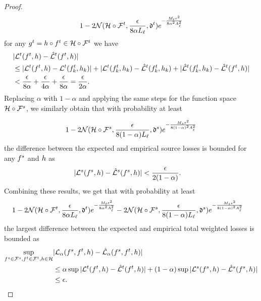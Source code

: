 \documentclass[review,supplement,onefignum,onetabnum]{siamonline250211}
\begin{document}
\begin{proof}
\[1 - 2 \mathcal{N}( \mathcal{H} \circ \mathcal{F}^t, \frac{\epsilon}{8 \alpha L_\ell}, \mathfrak{d}^t) e^{-\frac{M_t \epsilon^2}{8 \alpha^2 A_\ell^2}}
\]
%
for any $g^t = h \circ f^t \in \mathcal{H} \circ \mathcal{F}^t$ we have
%
\begin{equation*}
\begin{split}
& |  \mathcal{L}^t(  f^t, h ) - \hat{\mathcal{L}}^t(  f^t, h )   |  \\
&\leq   |  \mathcal{L}^t(  f^t, h ) - \mathcal{L}^t(  f^t_k, h_k ) | 
 + |   \mathcal{L}^t(  f^t_k, h_k ) -    \hat{\mathcal{L}}^t( f^t_k, h_k) 
  + |   \hat{\mathcal{L}}^t( f^t_k, h_k) -  \hat{\mathcal{L}}^t(  f^t, h )   |  \\
& <   \frac{\epsilon}{8 \alpha } + \frac{\epsilon}{4 \alpha} + \frac{\epsilon}{8 \alpha }
=  \frac{\epsilon}{2 \alpha }.
\end{split}
\end{equation*}
%
Replacing $\alpha$ with $1-\alpha$ and applying the same steps for the function space $\mathcal{H} \circ \mathcal{F}^s$, we similarly obtain that with probability at least 

\[
1 - 2 \mathcal{N}( \mathcal{H} \circ \mathcal{F}^s, \frac{\epsilon}{8 (1-\alpha) L_\ell}, \mathfrak{d}^s) e^{-\frac{M_s \epsilon^2}{8 (1-\alpha)^2 A_\ell^2}}
\]
%
the difference between the expected and empirical source losses is bounded for any $f^s$ and $h$ as
%
\begin{equation*}
\begin{split}
& |  \mathcal{L}^s(  f^s, h ) - \hat{\mathcal{L}}^s(  f^s, h )   |  <  
  \frac{\epsilon}{2 (1-\alpha) }.
\end{split}
\end{equation*}
%
Combining these results, we get that with probability at least 
%
\begin{equation}
\begin{split}
&1 - 2 \mathcal{N}( \mathcal{H} \circ \mathcal{F}^t, \frac{\epsilon}{8 \alpha L_\ell}, \mathfrak{d}^t) e^{-\frac{M_t \epsilon^2}{8 \alpha^2 A_\ell^2}} 
-2 \mathcal{N}( \mathcal{H} \circ \mathcal{F}^s, \frac{\epsilon}{8 (1-\alpha) L_\ell}, \mathfrak{d}^s) e^{-\frac{M_s \epsilon^2}{8 (1-\alpha)^2 A_\ell^2}}
\end{split}
\end{equation}
%
the largest difference between the expected and empirical total weighted losses is bounded as
%
\begin{equation*}
\begin{split}
\sup_{f^s \in \mathcal{F}^s, f^t \in \mathcal{F}^t, h \in \mathcal{H}}  & |  \mathcal{L}_{\alpha}( f^s, f^t, h ) - \hat{\mathcal{L}}_{\alpha}( f^s,  f^t, h )   | \\
& \leq \alpha \sup  |  \mathcal{L}^t(  f^t, h ) - \hat{\mathcal{L}}^t(  f^t, h )   | 
+ (1-\alpha) \sup   |  \mathcal{L}^s(  f^s, h ) - \hat{\mathcal{L}}^s(  f^s, h )   | \\
& \leq \epsilon.
\end{split}
\end{equation*}
%
\end{proof}
\end{document}
